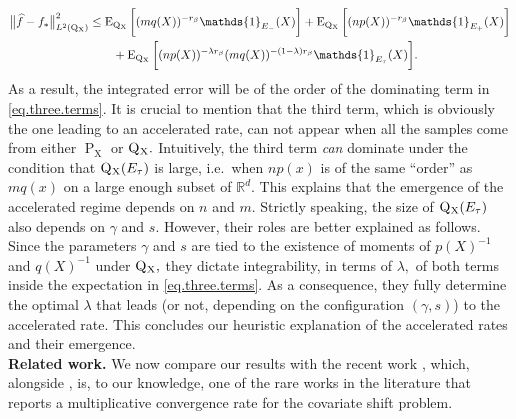 \documentclass[10pt]{article}
\newcommand{\RR}{\mathbb{R}}
\newcommand{\E}{\operatorname{E}}
\renewcommand{\P}{\operatorname{P}}
\newcommand{\Q}{\operatorname{Q}}
\newcommand{\wh}{\widehat}
\newcommand{\sX}{\mathrm{X}}
\begin{document}
\begin{align}
    \label{eq.three.terms}
    \begin{split}
    \big\|\wh f - f_*\big\|_{L^2(\Q\mathstrut_{\!\sX})}^2 &\leq \E_{\Q\mathstrut_{\!\sX}}\bigg[(mq(X))^{-r_\beta}\mathds{1}_{E_-}(X)\bigg] + \E_{\Q\mathstrut_{\!\sX}}\bigg[(np(X))^{-r_\beta}\mathds{1}_{E_+}(X) \bigg]\\
    &\qquad +\E_{\Q\mathstrut_{\!\sX}}\bigg[(np(X))^{-\lambda r_\beta} (mq(X))^{-(1 - \lambda)r_\beta}\mathds{1}_{E_\tau}(X) \bigg].
    \end{split}
\end{align}
As a result, the integrated error will be of the order of the dominating term in \eqref{eq.three.terms}. It is crucial to mention that the third term, which is obviously the one leading to an accelerated rate, can not appear when all the samples come from either 
$\P_{\sX}$ or $\Q\mathstrut_{\!\sX}.$ Intuitively, the third term \textit{can} dominate under the condition that $\Q\mathstrut_{\!\sX}(E_\tau)$ is large, i.e.\ when $np(x)$ is of the same \enquote{order} as $mq(x)$ on a large enough subset of $\RR^d.$ This explains that the emergence of the accelerated regime depends on $n$ and $m$. Strictly speaking, the size of $\Q\mathstrut_{\!\sX}(E_\tau)$ also depends on $\gamma$ and $s.$ However, their roles are better explained as follows. Since the parameters $\gamma$ and $s$ are tied to the existence of moments of $p(X)^{-1}$ and $q(X)^{-1}$ under $\Q\mathstrut_{\!\sX},$ they dictate integrability, in terms of $\lambda,$ of both terms inside the expectation in \eqref{eq.three.terms}. As a consequence, they fully determine the optimal $\lambda$ that leads (or not, depending on the configuration $(\gamma, s)$) to the accelerated rate. This concludes our heuristic explanation of the accelerated rates and their emergence.\\





\noindent\textbf{Related work.} \label{rem.synergistic} We now compare our results with the recent work \cite{zhou2025synergistic}, which, alongside \cite{schmidt2022local}, is, to our knowledge, one of the rare works in the literature that reports a multiplicative convergence rate for the covariate shift problem.\\
\end{document}
